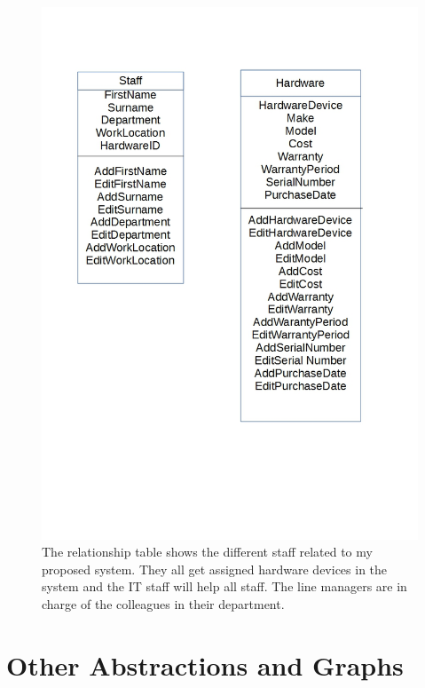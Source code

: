 \begin{figure}[H]
\hspace*{-1.3cm}
\vspace*{-1cm}
\includegraphics[width=1\textwidth]{ClassDefinitions.jpg}
\caption{The relationship table shows the different staff related to my proposed system. They all get assigned hardware devices in the system and the IT staff will help all staff. The line managers are in charge of the colleagues in their department.} \label{Class Definitions}
\end{figure}

\section{Other Abstractions and Graphs}

